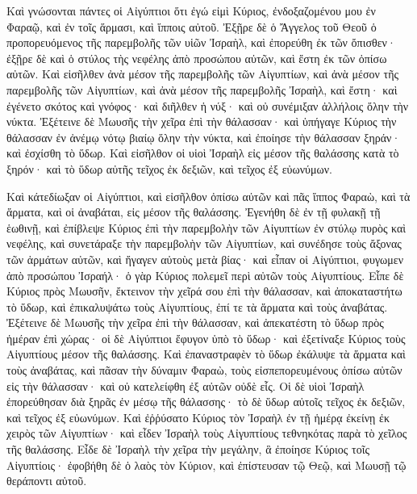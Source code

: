 {Καὶ γνώσονται πάντες οἱ Αἰγύπτιοι ὅτι ἐγώ εἰμὶ Κύριος, ἐνδοξαζομένου μου ἐν Φαραῷ, καὶ ἐν τοῖς ἅρμασι, καὶ ἵπποις αὐτοῦ.
Ἐξῇρε δὲ ὁ Ἄγγελος τοῦ Θεοῦ ὁ προπορευόμενος τῆς παρεμβολῆς τῶν υἱῶν Ἰσραὴλ, καὶ ἐπορεύθη ἐκ τῶν ὄπισθεν· ἐξῇρε δὲ καὶ ὁ στύλος τὴς νεφέλης ἀπὸ προσώπου αὐτῶν, καὶ ἔστη ἐκ τῶν ὀπίσω αὐτῶν.
Καὶ εἰσῆλθεν ἀνὰ μέσον τῆς παρεμβολῆς τῶν Αἰγυπτίων, καὶ ἀνὰ μέσον τῆς παρεμβολῆς τῶν Αἰγυπτίων, καὶ ἀνὰ μέσον τῆς παρεμβολῆς Ἰσραὴλ, καὶ ἔστη· καὶ ἐγένετο σκότος καὶ γνόφος· καὶ διῆλθεν ἡ νύξ· καὶ οὐ συνέμιξαν ἀλλήλοις ὅλην τὴν νύκτα.
Ἐξέτεινε δὲ Μωυσῆς τὴν χεῖρα ἐπὶ τὴν θάλασσαν· καὶ ὑπήγαγε Κύριος τὴν θάλασσαν ἐν ἀνέμῳ νότῳ βιαίῳ ὅλην τὴν νύκτα, καὶ ἐποίησε τὴν θάλασσαν ξηράν· καὶ ἐσχίσθη τὸ ὕδωρ.
Καὶ εἰσῆλθον οἱ υἱοὶ Ἰσραὴλ εἰς μέσον τῆς θαλάσσης κατὰ τὸ ξηρόν· καὶ τὸ ὕδωρ αὐτῆς τεῖχος ἐκ δεξιῶν, καὶ τεῖχος ἐξ εὐωνύμων.
\par }{\PP {}Καὶ κάτεδίωξαν οἱ Αἰγύπτιοι, καὶ εἰσῆλθον ὀπίσω αὐτῶν καὶ πᾶς ἵππος Φαραὼ, καὶ τὰ ἅρματα, καὶ οἱ ἀναβάται, εἰς μέσον τῆς θαλάσσης.
Ἐγενήθη δὲ ἐν τῇ φυλακῇ τῇ ἑωθινῇ, καὶ ἐπίβλεψε Κύριος ἐπὶ τὴν παρεμβολὴν τῶν Αἰγυπτίων ἐν στύλῳ πυρὸς καὶ νεφέλης, καὶ συνετάραξε τὴν παρεμβολὴν τῶν Αἰγυπτίων,
καὶ συνέδησε τοὺς ἄξονας τῶν ἁρμάτων αὐτῶν, καὶ ἤγαγεν αὐτοὺς μετὰ βίας· καὶ εἶπαν οἱ Αἰγύπτιοι, φυγωμεν ἀπὸ προσώπου Ἰσραήλ· ὁ γὰρ Κύριος πολεμεῖ περὶ αὐτῶν τοὺς Αἰγυπτίους.
Εἶπε δὲ Κύριος πρὸς Μωυσῆν, ἔκτεινον τὴν χεῖρά σου ἐπὶ τὴν θάλασσαν, καὶ ἀποκαταστήτω τὸ ὕδωρ, καὶ ἐπικαλυψάτω τοὺς Αἰγυπτίους, ἐπί τε τὰ ἅρματα καὶ τοὺς ἀναβάτας.
Ἐξέτεινε δὲ Μωυσῆς τὴν χεῖρα ἐπὶ τὴν θάλασσαν, καὶ ἀπεκατέστη τὸ ὕδωρ πρὸς ἡμέραν ἐπὶ χώρας· οἱ δὲ Αἰγύπτιοι ἔφυγον ὑπὸ τὸ ὕδωρ· καὶ ἐξετίναξε Κύριος τοὺς Αἰγυπτίους μέσον τῆς θαλάσσης.
Καὶ ἐπαναστραφὲν τὸ ὕδωρ ἐκάλυψε τὰ ἅρματα καὶ τοὺς ἀναβάτας, καὶ πᾶσαν τὴν δύναμιν Φαραὼ, τοὺς εἰσπεπορευμένους ὀπίσω αὐτῶν εἰς τὴν θάλασσαν· καὶ οὐ κατελείφθη ἐξ αὐτῶν οὐδὲ εἷς.
Οἱ δὲ υἱοὶ Ἰσραὴλ ἐπορεύθησαν διὰ ξηρᾶς ἐν μέσῳ τῆς θάλασσης· τὸ δὲ ὕδωρ αὐτοῖς τεῖχος ἐκ δεξιῶν, καὶ τεῖχος ἐξ εὐωνύμων.
Καὶ ἐῤῥύσατο Κύριος τὸν Ἰσραὴλ ἐν τῇ ἡμέρᾳ ἐκείνῃ ἐκ χειρὸς τῶν Αἰγυπτίων· καὶ εἶδεν Ἰσραὴλ τοὺς Αἰγυπτίους τεθνηκότας παρὰ τὸ χεῖλος τῆς θαλάσσης.
Εἶδε δὲ Ἰσραὴλ τὴν χεῖρα τὴν μεγάλην, ἃ ἐποίησε Κύριος τοῖς Αἰγυπτίοις· ἐφοβήθη δὲ ὁ λαὸς τὸν Κύριον, καὶ ἐπίστευσαν τῷ Θεῷ, καὶ Μωυσῇ τῷ θεράποντι αὐτοῦ.

}
